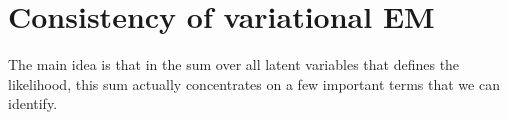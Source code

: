 \documentclass[../../main.tex]{subfiles} %
\begin{document}
\section{Consistency of variational EM}  %

The main idea is that in the sum over all latent 
variables that defines the likelihood, this sum 
actually concentrates on a few important terms that 
we can identify.
\end{document}
